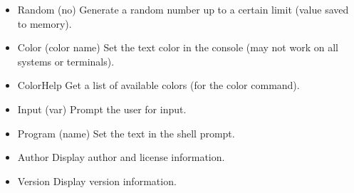 \documentclass{report}
\begin{document}
\begin{itemize}
\item{Random (no)}\newline
Generate a random number up to a certain limit (value saved to memory).

\item{Color (color name)}\newline
Set the text color in the console (may not work on all systems or terminals).

\item{ColorHelp}\newline
Get a list of available colors (for the color command).

\item{Input (var)}\newline
Prompt the user for input.

\item{Program (name)}\newline
Set the text in the shell prompt.

\item{Author}\newline
Display author and license information.

\item{Version}\newline
Display version information.
\end{itemize}
\end{document}
